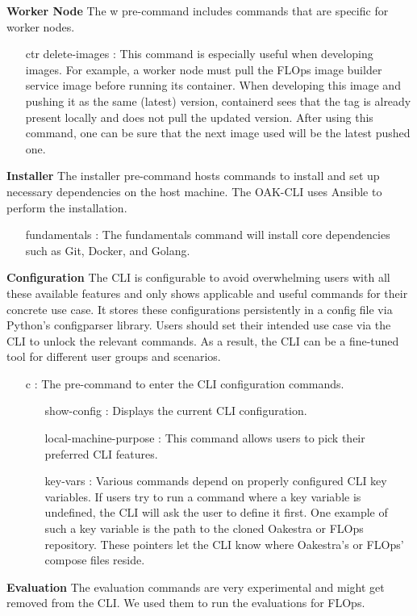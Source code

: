 \vspace{5mm}
\textbf{Worker Node}\newline
The w pre-command includes commands that are specific for worker nodes.
\begin{itemize}
    \item [ctr delete-images]:
        This command is especially useful when developing images.
        For example, a worker node must pull the FLOps image builder service image before running its container.
        When developing this image and pushing it as the same (latest) version, containerd sees that the tag is already present locally and does not pull the updated version.
        After using this command, one can be sure that the next image used will be the latest pushed one.
\end{itemize}
\vspace{5mm}
\textbf{Installer}\newline
The installer pre-command hosts commands to install and set up necessary dependencies on the host machine.
The OAK-CLI uses Ansible to perform the installation.
\begin{itemize}
    \item [fundamentals]:
        The fundamentals command will install core dependencies such as Git, Docker, and Golang.
\end{itemize}
\vspace{5mm}
\textbf{Configuration}\newline
The CLI is configurable to avoid overwhelming users with all these available features and only shows applicable and useful commands for their concrete use case.
It stores these configurations persistently in a config file via Python's configparser library.
Users should set their intended use case via the CLI to unlock the relevant commands.
As a result, the CLI can be a fine-tuned tool for different user groups and scenarios.
\begin{itemize}
    \item [c]:
        The pre-command to enter the CLI configuration commands.
        \begin{itemize}
            \item [show-config]:
                Displays the current CLI configuration.
            \item [local-machine-purpose]:
                This command allows users to pick their preferred CLI features.
            \item [key-vars]:
                Various commands depend on properly configured CLI key variables.
                If users try to run a command where a key variable is undefined, the CLI will ask the user to define it first.
                One example of such a key variable is the path to the cloned Oakestra or FLOps repository.
                These pointers let the CLI know where Oakestra's or FLOps' compose files reside.
        \end{itemize}
\end{itemize}
\vspace{5mm}
\textbf{Evaluation}\newline
The evaluation commands are very experimental and might get removed from the CLI.
We used them to run the evaluations for FLOps.

